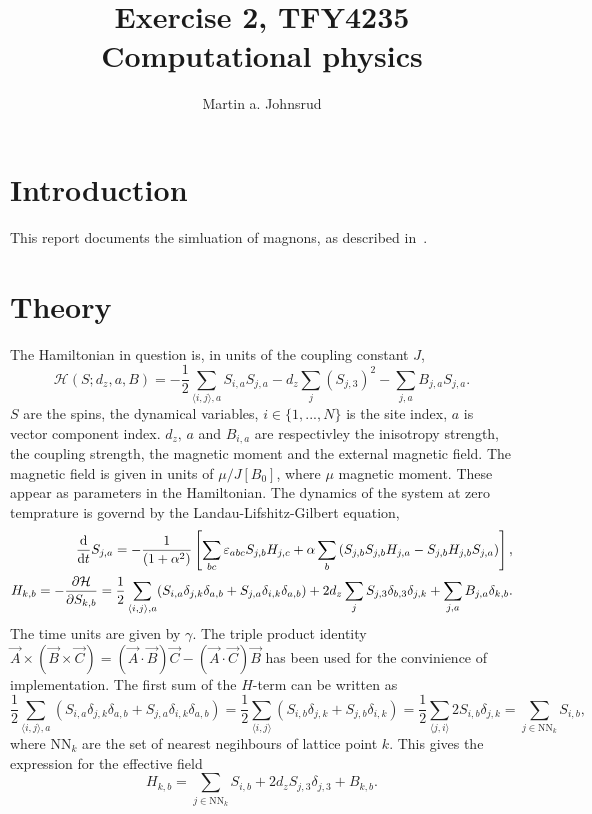 \documentclass{article}
\title{Exercise 2, TFY4235 Computational physics}
\author{Martin a. Johnsrud}
\date{}
\begin{document}
    \maketitle
    \section*{Introduction}
    This report documents the simluation of magnons, as described in~\cite{exercise}.

    \section*{Theory}
    The Hamiltonian in question is, in units of the coupling constant $J$, 
    \begin{equation*}
        \mathcal{H}(S; d_z, a, B) = -\frac{1}{2} \sum_{\langle i, j \rangle, a} S_{i, a} S_{j, a} - d_z \sum_{j} (S_{j,3})^2 -  \sum_{j, a} B_{j, a} S_{j,a}.
    \end{equation*}
    $S$ are the spins, the dynamical variables, $i\in\{1, ..., N\}$ is the site index, $a$ is vector component index. $d_z, \, a$ and $B_{i, a}$ are respectivley the inisotropy strength, the coupling strength, the magnetic moment and the external magnetic field. The magnetic field is given in units of $\mu/J[B_0]$, where $\mu$ magnetic moment. These appear as parameters in the Hamiltonian. The dynamics of the system at zero temprature is governd by the Landau-Lifshitz-Gilbert equation,
    \begin{align*}
        \dv{t} S_{j, a} = - \frac{1}{(1 + \alpha^2)}\left[\sum_{b c}\varepsilon_{abc}S_{j, b}H_{j,c} + \alpha \sum_{b}\left(S_{j, b}S_{j, b}H_{j, a} - S_{j, b}H_{j, b}S_{j, a}\right)\right], \\
        H_{k, b} = - \pdv{\mathcal{H}}{S_{k, b}} = \frac{1}{2}\sum_{\langle i, j \rangle, a} (S_{i, a}\delta_{j,k}\delta_{a, b} + S_{j, a}\delta_{i,k}\delta_{a, b}) + 2 d_z \sum_{j} S_{j,3} \delta_{b, 3}\delta_{j, k} +  \sum_{j, a} B_{j, a} \delta_{k,b}.
    \end{align*}
    The time units are given by $\gamma$. The triple product identity $\vec A \times (\vec B \times \vec C) = (\vec A \cdot \vec B) \vec C - (\vec A \cdot \vec C) \vec B$ has been used for the convinience of implementation. The first sum of the $H$-term can be written as
    \begin{equation*}
        \frac{1}{2}\sum_{\langle i, j \rangle, a} (S_{i, a}\delta_{j,k}\delta_{a, b} + S_{j, a}\delta_{i,k}\delta_{a, b}) = \frac{1}{2}\sum_{\langle i, j \rangle} (S_{i, b}\delta_{j,k} + S_{j, b}\delta_{i,k}) = \frac{1}{2}\sum_{\langle j, i \rangle} 2S_{i, b} \delta_{j, k} = \sum_{j \in \mathrm{NN}_k} S_{i, b},
    \end{equation*}
    where $\mathrm{NN}_k$ are the set of nearest negihbours of lattice point $k$. This gives the expression for the effective field
    \begin{equation*}
        H_{k, b} = \sum_{j \in \mathrm{NN}_k} S_{i, b} + 2d_z S_{j, 3} \delta_{j, 3} +  B_{k, b}.
    \end{equation*}
    
    
\end{document}
